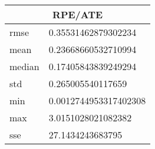 \begin{table}[!ht] 
 \centering 
 \begin{tabular}{|l|l|} \hline 
 \multicolumn{2}{|c|}{RPE/ATE} \\ \hline 
 rmse & 0.35531462879302234 \\ \hline 
mean & 0.23668660532710994 \\ \hline 
median & 0.17405843839249294 \\ \hline 
std & 0.265005540117659 \\ \hline 
min & 0.0012744953317402308 \\ \hline 
max & 3.0151028021082382 \\ \hline 
sse & 27.1434243683795 \\ \hline 
\end{tabular} 
 \end{table}